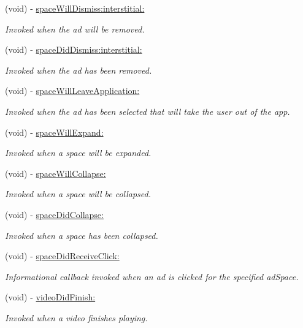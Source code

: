 \begin{DoxyCompactItemize}
(void) -\/ \hyperlink{protocolFlurryAdDelegate_01-p_a4e39fac0521e2e56e095d29f04f173c3}{space\+Will\+Dismiss\+:interstitial\+:}
\begin{DoxyCompactList}\small\item\em Invoked when the ad will be removed. \end{DoxyCompactList}\item 
(void) -\/ \hyperlink{protocolFlurryAdDelegate_01-p_a18f10b96c0332ed1c482bc835d8867a3}{space\+Did\+Dismiss\+:interstitial\+:}
\begin{DoxyCompactList}\small\item\em Invoked when the ad has been removed. \end{DoxyCompactList}\item 
(void) -\/ \hyperlink{protocolFlurryAdDelegate_01-p_a910cb5e909faea49101305a5740ecccb}{space\+Will\+Leave\+Application\+:}
\begin{DoxyCompactList}\small\item\em Invoked when the ad has been selected that will take the user out of the app. \end{DoxyCompactList}\item 
(void) -\/ \hyperlink{protocolFlurryAdDelegate_01-p_ad1c9f8b7c7d8ba096be69f48a2b87fd5}{space\+Will\+Expand\+:}
\begin{DoxyCompactList}\small\item\em Invoked when a space will be expanded. \end{DoxyCompactList}\item 
(void) -\/ \hyperlink{protocolFlurryAdDelegate_01-p_a175999b6e0069b35919f24ab3e8f6c49}{space\+Will\+Collapse\+:}
\begin{DoxyCompactList}\small\item\em Invoked when a space will be collapsed. \end{DoxyCompactList}\item 
(void) -\/ \hyperlink{protocolFlurryAdDelegate_01-p_a5094ad1ca096d70d75b05a5ab4a9a9a5}{space\+Did\+Collapse\+:}
\begin{DoxyCompactList}\small\item\em Invoked when a space has been collapsed. \end{DoxyCompactList}\item 
(void) -\/ \hyperlink{protocolFlurryAdDelegate_01-p_a9d972858b15ed8102d1675fc96bbd97c}{space\+Did\+Receive\+Click\+:}
\begin{DoxyCompactList}\small\item\em Informational callback invoked when an ad is clicked for the specified {\ttfamily ad\+Space}. \end{DoxyCompactList}\item 
(void) -\/ \hyperlink{protocolFlurryAdDelegate_01-p_a26d6d70993f75935789bf7ad45f3ca3c}{video\+Did\+Finish\+:}
\begin{DoxyCompactList}\small\item\em Invoked when a video finishes playing. \end{DoxyCompactList}\end{DoxyCompactItemize}
